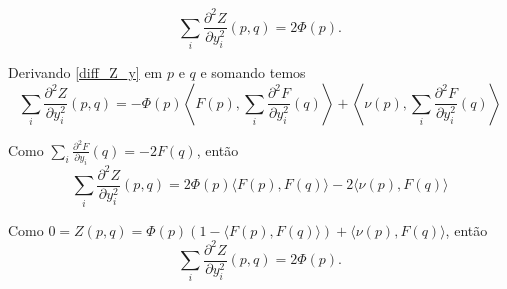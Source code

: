 
\begin{proposicao}
	\begin{equation*}
	\sum_i \frac{\partial^2 Z}{\partial y_i^2}(p,q) = 2 \Phi(p).
	\end{equation*}
\end{proposicao}

\begin{demonstracao}
	Derivando \ref{diff_Z_y} em $p$ e $q$ e somando  temos
	\begin{equation*}
		\sum_i \frac{\partial^2 Z}{\partial y_i^2}(p,q) = - \Phi(p) \left\langle F(p), \sum_i \frac{\partial^2 F}{\partial y_i^2}(q) \right\rangle + \left\langle \nu(p), \sum_i \frac{\partial^2 F}{\partial y_i^2}(q) \right\rangle
	\end{equation*}
	
	Como $\sum_i \frac{\partial^2 F}{\partial y_i}(q) = -2 F(q)$, então
	\begin{equation*}
		\sum_i \frac{\partial^2 Z}{\partial y_i^2}(p,q) = 2 \Phi(p) \langle F(p), F(q) \rangle - 2 \langle \nu(p), F(q) \rangle
	\end{equation*}
	
	Como $0 = Z(p,q) = \Phi(p)(1 - \langle F(p), F(q) \rangle) + \langle \nu(p), F(q) \rangle$, então
	\begin{equation*}
		\sum_i \frac{\partial^2 Z}{\partial y_i^2}(p,q) = 2 \Phi(p).
	\end{equation*}
\end{demonstracao}


